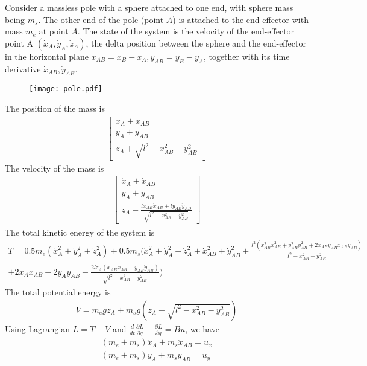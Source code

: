 \documentclass{article}
\begin{document}
Consider a massless pole with a sphere attached to one end, with sphere mass being $m_s$. The other end of the pole (point $A$) is attached to the end-effector with mass $m_e$ at point $A$. The state of the system is the velocity of the end-effector point A $(\dot{x}_A, \dot{y}_A, \dot{z}_A)$, the delta position between the sphere and the end-effector in the horizontal plane $x_{AB} = x_B - x_A, y_{AB} = y_B-y_A$, together with its time derivative $\dot{x}_{AB}, \dot{y}_{AB}$.

\begin{figure}
	\centering
	\texttt{[image: pole.pdf]}
\end{figure}

The position of the mass is
\begin{align}
	\begin{bmatrix}
		x_A + x_{AB}\\
		y_A + y_{AB}\\
		z_A + \sqrt{l^2 - x_{AB}^2 - y_{AB}^2}
	\end{bmatrix}
\end{align}
The velocity of the mass is
\begin{align}
	\begin{bmatrix}
		\dot{x}_A + \dot{x}_{AB}\\
		\dot{y}_A + \dot{y}_{AB}\\
		\dot{z}_A - \frac{lx_{AB}\dot{x}_{AB} + ly_{AB}\dot{y}_{AB}}{\sqrt{l^2-x_{AB}^2 - y_{AB}^2}}
	\end{bmatrix}
\end{align}
The total kinetic energy of the system is
\begin{multline}
	T = 0.5 m_e (\dot{x}_A^2 + \dot{y}_A^2 +\dot{z}_A^2) + 0.5 m_s(\dot{x}_A^2 + \dot{y}_A^2 + \dot{z}_A^2 + \dot{x}_{AB}^2 + \dot{y}_{AB}^2 + \frac{l^2(x_{AB}^2\dot{x}_{AB}^2 + y_{AB}^2\dot{y}_{AB}^2 + 2x_{AB}y_{AB}\dot{x}_{AB}\dot{y}_{AB})}{l^2-x_{AB}^2-y_{AB}^2}\\
	+ 2\dot{x}_A\dot{x}_{AB} + 2\dot{y}_A\dot{y}_{AB} - \frac{2l\dot{z}_A(x_{AB}\dot{x}_{AB}+y_{AB}\dot{y}_{AB})}{\sqrt{l^2-x_{AB}^2-y_{AB}^2}})
\end{multline}
The total potential energy is
\begin{align}
	V = m_egz_A + m_sg(z_A + \sqrt{l^2-x_{AB}^2-y_{AB}^2})
\end{align}
Using Lagrangian $L = T-V$ and $\frac{d}{dt}\frac{\partial L}{\partial \dot{q}}-\frac{\partial L}{\partial q} = Bu$, we have
\begin{align}
	(m_e + m_s)\ddot{x}_A + m_s\ddot{x}_{AB} = u_x\\
	(m_e + m_s)\ddot{y}_A + m_s\ddot{y}_{AB} = u_y
\end{align}
\end{document}
